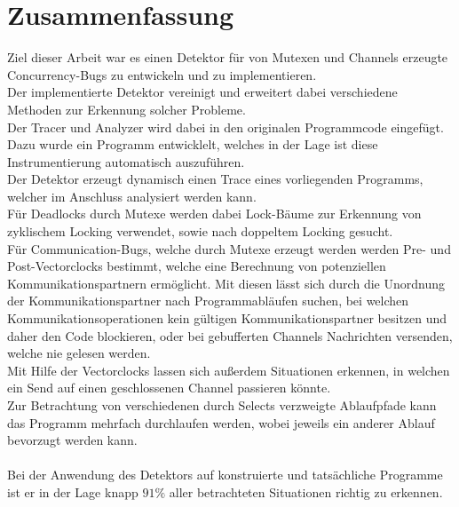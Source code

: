 \chapter{Zusammenfassung}\label{chap:conclusion}
Ziel dieser Arbeit war es einen Detektor für von Mutexen 
und Channels erzeugte Concurrency-Bugs zu entwickeln und zu implementieren.\\
Der implementierte Detektor vereinigt und erweitert dabei verschiedene Methoden 
zur Erkennung solcher Probleme.\\
Der Tracer und Analyzer wird dabei in den originalen Programmcode eingefügt.
Dazu wurde ein Programm entwicklelt, welches in der Lage ist diese Instrumentierung
automatisch auszuführen.\\
Der Detektor erzeugt dynamisch einen Trace 
eines vorliegenden Programms, welcher im Anschluss analysiert werden kann.\\
Für Deadlocks durch Mutexe werden dabei Lock-Bäume zur Erkennung von zyklischem 
Locking verwendet, sowie nach doppeltem Locking gesucht.\\
Für Communication-Bugs, welche durch Mutexe erzeugt werden
werden Pre- und Post-Vectorclocks bestimmt, welche eine Berechnung
von potenziellen Kommunikationspartnern ermöglicht. Mit diesen lässt sich 
durch die Unordnung der Kommunikationspartner nach Programmabläufen suchen, 
bei welchen Kommunikationsoperationen kein gültigen Kommunikationspartner 
besitzen und daher den Code blockieren, oder bei gebufferten Channels 
Nachrichten versenden, welche nie gelesen werden. \\
Mit Hilfe der Vectorclocks lassen sich außerdem Situationen erkennen, 
in welchen ein Send auf einen geschlossenen Channel passieren könnte.\\
Zur Betrachtung von verschiedenen durch Selects verzweigte Ablaufpfade
kann das Programm mehrfach durchlaufen werden, wobei jeweils ein 
anderer Ablauf bevorzugt werden kann.\\\\
Bei der Anwendung des Detektors auf konstruierte und tatsächliche Programme 
ist er in der Lage knapp $91\%$ aller betrachteten 
Situationen richtig zu erkennen. 